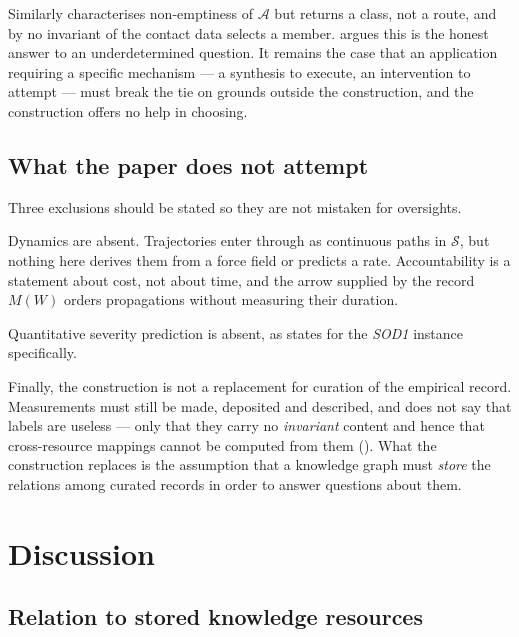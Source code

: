 \documentclass[11pt,twocolumn,a4paper]{article}
\theoremstyle{thmstyle}
\theoremstyle{definition}
\theoremstyle{remark}
\newcommand{\rec}{M}
\newcommand{\Walk}{W}
\newcommand{\acc}{\mathcal{A}}
\newcommand{\Sspace}{\mathcal{S}}
\begin{document}
Similarly  characterises non-emptiness of
$\acc$ but returns a class, not a route, and by 
no invariant of the contact data selects a member.
 argues this is the honest answer to an
underdetermined question. It remains the case that an application
requiring a specific mechanism --- a synthesis to execute, an
intervention to attempt --- must break the tie on grounds outside the
construction, and the construction offers no help in choosing.

\subsection{What the paper does not attempt}

Three exclusions should be stated so they are not mistaken for
oversights.

Dynamics are absent. Trajectories enter through 
as continuous paths in $\Sspace$, but nothing here derives them from a
force field or predicts a rate. Accountability is a statement about
cost, not about time, and the arrow supplied by the record
$\rec(\Walk)$ orders propagations without measuring their duration.

Quantitative severity prediction is absent, as 
states for the \emph{SOD1} instance specifically.

Finally, the construction is not a replacement for curation of the
empirical record. Measurements must still be made, deposited and
described, and  does not say that labels are
useless --- only that they carry no \emph{invariant} content and hence
that cross-resource mappings cannot be computed from them
(). What the construction replaces is the assumption
that a knowledge graph must \emph{store} the relations among curated
records in order to answer questions about them.

\section{Discussion}
\label{sec:discussion}

\subsection{Relation to stored knowledge resources}
\end{document}
